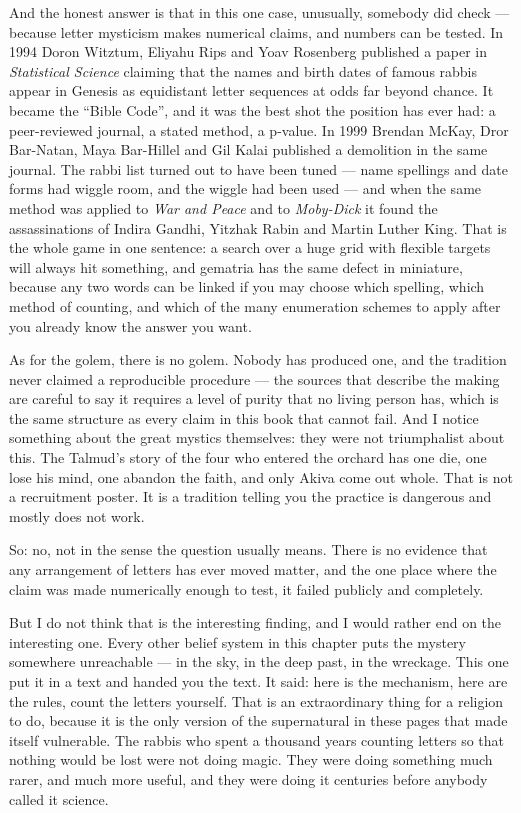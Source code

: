 And the honest answer is that in this one case, unusually, somebody did check --- because letter
mysticism makes numerical claims, and numbers can be tested. In 1994 Doron Witztum, Eliyahu Rips
and Yoav Rosenberg published a paper in \emph{Statistical Science} claiming that the names and
birth dates of famous rabbis appear in Genesis as equidistant letter sequences at odds far beyond
chance. It became the ``Bible Code'', and it was the best shot the position has ever had: a
peer-reviewed journal, a stated method, a p-value. In 1999 Brendan McKay, Dror Bar-Natan, Maya
Bar-Hillel and Gil Kalai published a demolition in the same journal. The rabbi list turned out to
have been tuned --- name spellings and date forms had wiggle room, and the wiggle had been used ---
and when the same method was applied to \emph{War and Peace} and to \emph{Moby-Dick} it found the
assassinations of Indira Gandhi, Yitzhak Rabin and Martin Luther King. That is the whole game in
one sentence: a search over a huge grid with flexible targets will always hit something, and
gematria has the same defect in miniature, because any two words can be linked if you may choose
which spelling, which method of counting, and which of the many enumeration schemes to apply after
you already know the answer you want.

As for the golem, there is no golem. Nobody has produced one, and the tradition never claimed a
reproducible procedure --- the sources that describe the making are careful to say it requires a
level of purity that no living person has, which is the same structure as every claim in this book
that cannot fail. And I notice something about the great mystics themselves: they were not
triumphalist about this. The Talmud's story of the four who entered the orchard has one die, one
lose his mind, one abandon the faith, and only Akiva come out whole. That is not a recruitment
poster. It is a tradition telling you the practice is dangerous and mostly does not work.

So: no, not in the sense the question usually means. There is no evidence that any arrangement of
letters has ever moved matter, and the one place where the claim was made numerically enough to
test, it failed publicly and completely.

But I do not think that is the interesting finding, and I would rather end on the interesting one.
Every other belief system in this chapter puts the mystery somewhere unreachable --- in the sky, in
the deep past, in the wreckage. This one put it in a text and handed you the text. It said: here is
the mechanism, here are the rules, count the letters yourself. That is an extraordinary thing for a
religion to do, because it is the only version of the supernatural in these pages that made itself
vulnerable.  The rabbis who spent a thousand years counting letters so that nothing
would be lost were not doing magic. They were doing something much rarer, and much more useful, and
they were doing it centuries before anybody called it science.

